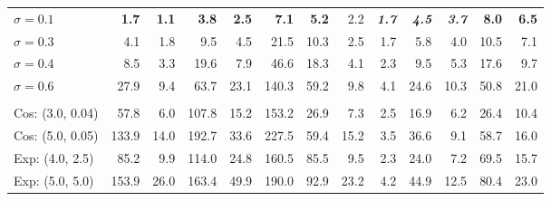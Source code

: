 \begin{table}[hbp]
\begin{tabular}{lrrrrrrrrrrrr}
\quad $\sigma=0.1$ & \textbf{1.7} & \textbf{1.1} & \textbf{3.8} & \textbf{2.5} & \textbf{7.1} & \textbf{5.2} & 2.2 & \textbf{\textit{1.7}} & \textbf{\textit{4.5}} & \textbf{\textit{3.7}} & \textbf{8.0} & \textbf{6.5} \\
\quad $\sigma=0.3$ & 4.1 & 1.8 & 9.5 & 4.5 & 21.5 & 10.3 & 2.5 & 1.7 & 5.8 & 4.0 & 10.5 & 7.1 \\
\quad $\sigma=0.4$ & 8.5 & 3.3 & 19.6 & 7.9 & 46.6 & 18.3 & 4.1 & 2.3 & 9.5 & 5.3 & 17.6 & 9.7 \\
\quad $\sigma=0.6$ & 27.9 & 9.4 & 63.7 & 23.1 & 140.3 & 59.2 & 9.8 & 4.1 & 24.6 & 10.3 & 50.8 & 21.0 \\
\rowcolor{gray!20} \multicolumn{13}{l}{\textit{Noise-to-Data Diffusion}} \\
\quad Cos: (3.0, 0.04) & 57.8 & 6.0 & 107.8 & 15.2 & 153.2 & 26.9 & 7.3 & 2.5 & 16.9 & 6.2 & 26.4 & 10.4 \\
\quad Cos: (5.0, 0.05) & 133.9 & 14.0 & 192.7 & 33.6 & 227.5 & 59.4 & 15.2 & 3.5 & 36.6 & 9.1 & 58.7 & 16.0 \\
\quad Exp: (4.0, 2.5) & 85.2 & 9.9 & 114.0 & 24.8 & 160.5 & 85.5 & 9.5 & 2.3 & 24.0 & 7.2 & 69.5 & 15.7 \\
\quad Exp: (5.0, 5.0) & 153.9 & 26.0 & 163.4 & 49.9 & 190.0 & 92.9 & 23.2 & 4.2 & 44.9 & 12.5 & 80.4 & 23.0 \\
\bottomrule
\end{tabular}
\end{table}


